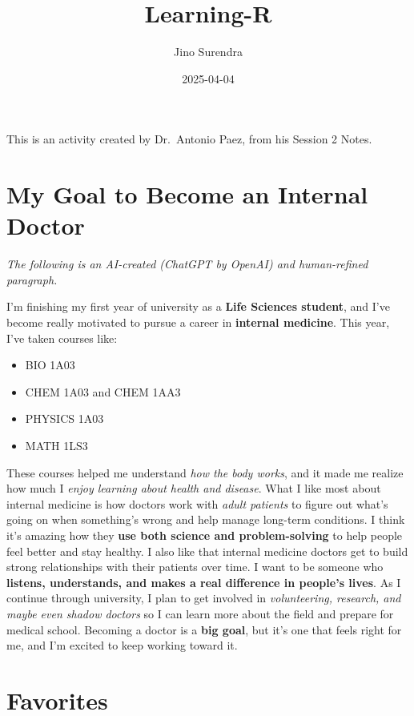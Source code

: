 \documentclass[
]{article}
\title{Learning-R}
\author{Jino Surendra}
\date{2025-04-04}
\providecommand{\tightlist}{%
  \setlength{\itemsep}{0pt}\setlength{\parskip}{0pt}}
\begin{document}
\maketitle

This is an activity created by Dr.~Antonio Paez, from his Session 2
Notes.

\section{My Goal to Become an Internal
Doctor}\label{my-goal-to-become-an-internal-doctor}

\emph{The following is an AI-created (ChatGPT by OpenAI) and
human-refined paragraph.}

I'm finishing my first year of university as a \textbf{Life Sciences
student}, and I've become really motivated to pursue a career in
\textbf{internal medicine}. This year, I've taken courses like:

\begin{itemize}
\tightlist
\item
  BIO 1A03
\item
  CHEM 1A03 and CHEM 1AA3
\item
  PHYSICS 1A03
\item
  MATH 1LS3
\end{itemize}

These courses helped me understand \emph{how the body works}, and it
made me realize how much I \emph{enjoy learning about health and
disease}. What I like most about internal medicine is how doctors work
with \emph{adult patients} to figure out what's going on when
something's wrong and help manage long-term conditions. I think it's
amazing how they \textbf{use both science and problem-solving} to help
people feel better and stay healthy. I also like that internal medicine
doctors get to build strong relationships with their patients over time.
I want to be someone who \textbf{listens, understands, and makes a real
difference in people's lives}. As I continue through university, I plan
to get involved in \emph{volunteering, research, and maybe even shadow
doctors} so I can learn more about the field and prepare for medical
school. Becoming a doctor is a \textbf{big goal}, but it's one that
feels right for me, and I'm excited to keep working toward it.

\section{Favorites}\label{favorites}
\end{document}
